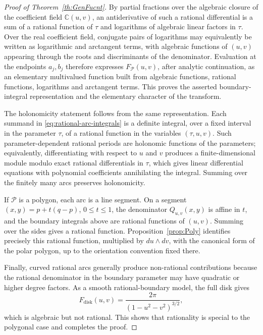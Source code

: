 \documentclass[10pt,a4paper]{amsart}
\newcommand {\bC} {\mathbb {C}}
\newcommand {\cP} {\mathcal P}
\begin{document}
\begin{proof}[Proof of Theorem~\ref{th:GenFucnt}]
By partial fractions over the algebraic closure of the coefficient field $\bC(u,v)$, an antiderivative of such a rational differential is a sum of a rational function of $\tau$ and logarithms of algebraic linear factors in $\tau$.  Over the real coefficient field, conjugate pairs of logarithms may equivalently be written as logarithmic and arctangent terms, with algebraic functions of $(u,v)$ appearing through the roots and discriminants of the denominator.  Evaluation at the endpoints $a_j,b_j$ therefore expresses $F_{\cP}(u,v)$, after analytic continuation, as an elementary multivalued function built from algebraic functions, rational functions, logarithms and arctangent terms.  This proves the asserted boundary-integral representation and the elementary character of the transform.

The holonomicity statement follows from the same representation.  Each summand in \eqref{eq:rational-arc-integrals} is a definite integral, over a fixed interval in the parameter $\tau$, of a rational function in the variables $(\tau,u,v)$.  Such parameter-dependent rational periods are holonomic functions of the parameters; equivalently, differentiating with respect to $u$ and $v$ produces a finite-dimensional module modulo exact rational differentials in $\tau$, which gives linear differential equations with polynomial coefficients annihilating the integral.  Summing over the finitely many arcs preserves holonomicity.

If $\cP$ is a polygon, each arc is a line segment.  On a segment $(x,y)=p+t(q-p)$, $0\le t\le1$, the denominator $Q_{u,v}(x,y)$ is affine in $t$, and the boundary integrals above are rational functions of $(u,v)$.  Summing over the sides gives a rational function.  Proposition~\ref{prop:Poly} identifies precisely this rational function, multiplied by $du\wedge dv$, with the canonical form of the polar polygon, up to the orientation convention fixed there.

Finally, curved rational arcs generally produce non-rational contributions because the rational denominator in the boundary parameter may have quadratic or higher degree factors.  As a smooth rational-boundary model, the full disk gives
\[
        F_{\mathrm{disk}}(u,v)=\frac{2\pi}{(1-u^2-v^2)^{3/2}},
\]
which is algebraic but not rational.  This shows that rationality is special to the polygonal case and completes the proof.
\end{proof}
\end{document}

